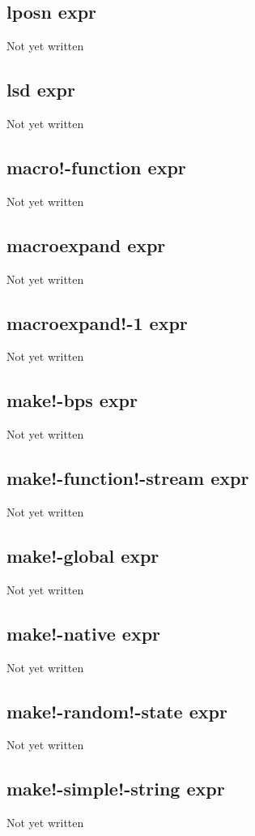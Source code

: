 \documentclass[a4paper,11pt]{article}
\begin{document}
\subsection{\ttfamily lposn expr}
Not yet written

\subsection{\ttfamily lsd expr}
Not yet written

\subsection{\ttfamily macro!-function expr}
Not yet written

\subsection{\ttfamily macroexpand expr}
Not yet written

\subsection{\ttfamily macroexpand!-1 expr}
Not yet written

\subsection{\ttfamily make!-bps expr}
Not yet written

\subsection{\ttfamily make!-function!-stream expr}
Not yet written

\subsection{\ttfamily make!-global expr}
Not yet written

\subsection{\ttfamily make!-native expr}
Not yet written

\subsection{\ttfamily make!-random!-state expr}
Not yet written

\subsection{\ttfamily make!-simple!-string expr}
Not yet written
\end{document}
